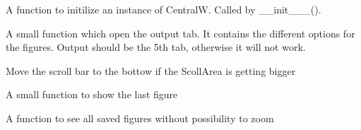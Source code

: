 \documentclass[letterpaper,10pt,english]{sphinxmanual}
\begin{document}
\begin{fulllineitems}

\begin{fulllineitems}
\label{\detokenize{index:src_GUI.Main_windows_1.CentralW.init_iu}}
A function to initilize an instance of CentralW. Called by \_\_init\_\_\_().

\end{fulllineitems}


\begin{fulllineitems}
\label{\detokenize{index:src_GUI.Main_windows_1.CentralW.optfig}}
A small function which open the output tab. It contains the different options for the figures.
Output should be the 5th tab, otherwise it will not work.

\end{fulllineitems}


\begin{fulllineitems}
\label{\detokenize{index:src_GUI.Main_windows_1.CentralW.scrolldown}}
Move the scroll bar to the bottow if the ScollArea is getting bigger

\end{fulllineitems}


\begin{fulllineitems}
\label{\detokenize{index:src_GUI.Main_windows_1.CentralW.showfig}}
A small function to show the last figure

\end{fulllineitems}


\begin{fulllineitems}
\label{\detokenize{index:src_GUI.Main_windows_1.CentralW.showfig2}}
A function to see all saved figures without possibility to zoom

\end{fulllineitems}


\end{fulllineitems}
\end{document}
